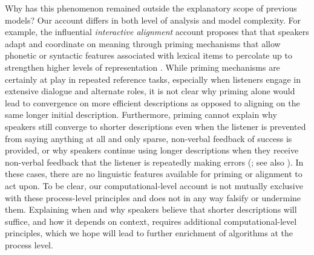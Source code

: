 Why has this phenomenon remained outside the explanatory scope of previous models?
Our account differs in both level of analysis and model complexity.
For example, the influential \emph{interactive alignment} account proposes that that speakers adapt and coordinate on meaning through priming mechanisms that allow phonetic or syntactic features associated with lexical items to percolate up to strengthen higher levels of representation \cite{pickering2004toward, pickering2006alignment,roelofs1992spreading}.
While priming mechanisms are certainly at play in repeated reference tasks, especially when listeners engage in extensive dialogue and alternate roles, it is not clear why priming alone would lead to convergence on more efficient descriptions as opposed to aligning on the same longer initial description.
Furthermore, priming cannot explain why speakers still converge to shorter descriptions even when the listener is prevented from saying anything at all and only sparse, non-verbal feedback of success is provided, or why speakers continue using longer descriptions when they receive non-verbal feedback that the listener is repeatedly making errors (; see also ).
In these cases, there are no linguistic features available for priming or alignment to act upon.
To be clear, our computational-level account is not mutually exclusive with these process-level principles and does not in any way falsify or undermine them.
Explaining when and why speakers believe that shorter descriptions will suffice, and how it depends on context, requires additional computational-level principles, which we hope will lead to further enrichment of algorithms at the process level.

